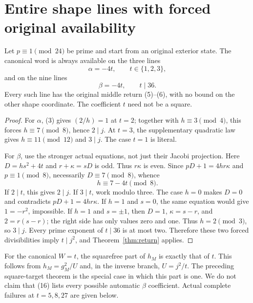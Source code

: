 \section{Entire shape lines with forced original availability}
\begin{theorem}\label{thm:auto}
Let $p\equiv1\pmod{24}$ be prime and start from an original exterior state.
The canonical word is always available on the three lines
\[
 \alpha=-4t,\qquad t\in\{1,2,3\},
\]
and on the nine lines
\[
 \boxed{\beta=-4t,\qquad t\mid36.}                      \tag{16}
\]
Every such line has the original middle return (5)--(6), with no bound on the
other shape coordinate. The coefficient $t$ need not be a square.
\end{theorem}
\begin{proof}
For $\alpha$, (3) gives $(2/h)=1$ at $t=2$; together with $h\equiv3\pmod4$,
this forces $h\equiv7\pmod8$, hence $2\mid j$. At $t=3$, the supplementary
quadratic law gives $h\equiv11\pmod{12}$ and $3\mid j$. The case $t=1$ is literal.

For $\beta$, use the stronger actual equations, not just their Jacobi projection.
Here $D=hs^2+4t$ and $r+\kappa=sD$ is odd. Thus $r\kappa$ is even. Since
$pD+1=4hr\kappa$ and $p\equiv1\pmod8$, necessarily $D\equiv7\pmod8$, whence
\[
 h\equiv7-4t\pmod8.
\]
If $2\mid t$, this gives $2\mid j$.
If $3\mid t$, work modulo three. The case $h=0$ makes $D=0$ and contradicts
$pD+1=4hr\kappa$. If $h=1$ and $s=0$, the same equation would give
$1=-r^2$, impossible. If $h=1$ and $s=\pm1$, then $D=1$, $\kappa=s-r$, and
$2=r(s-r)$; the right side has only values zero and one. Thus $h=2\pmod3$,
so $3\mid j$. Every prime exponent of $t\mid36$ is at most two. Therefore
these two forced divisibilities imply $t\mid j^2$, and Theorem~\ref{thm:return}
applies.
\end{proof}

For the canonical $W=t$, the squarefree part of $h_M$ is exactly that of $t$.
This follows from $h_M=g_M^2/U$ and, in the inverse branch, $U=j^2/t$.
The preceding square-target theorem is the special case in which this part is one.
We do not claim that (16) lists every possible automatic $\beta$ coefficient.
Actual complete failures at $t=5,8,27$ are given below.

